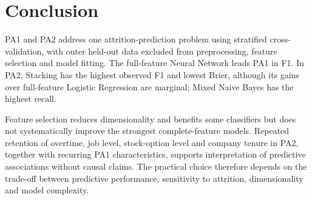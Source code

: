 \section{Conclusion}
PA1 and PA2 address one attrition-prediction problem using stratified cross-validation, with outer held-out data excluded from preprocessing, feature selection and model fitting. The full-feature Neural Network leads PA1 in F1. In PA2, Stacking has the highest observed F1 and lowest Brier, although its gains over full-feature Logistic Regression are marginal; Mixed Naive Bayes has the highest recall.

Feature selection reduces dimensionality and benefits some classifiers but does not systematically improve the strongest complete-feature models. Repeated retention of overtime, job level, stock-option level and company tenure in PA2, together with recurring PA1 characteristics, supports interpretation of predictive associations without causal claims. The practical choice therefore depends on the trade-off between predictive performance, sensitivity to attrition, dimensionality and model complexity.
